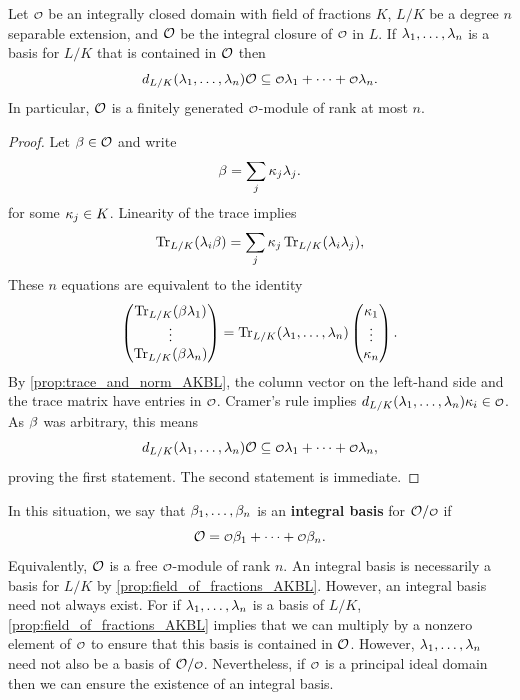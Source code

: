     \begin{lemma}\label{lem:lemma_for_integral_basis_AKBL}
      Let \(\smc{O}\) be an integrally closed domain with field of fractions \(K\), \(L/K\) be a degree \(n\) separable extension, and \(\mathcal{O}\) be the integral closure of \(\smc{O}\) in \(L\). If \(\lambda_{1},\ldots,\lambda_{n}\) is a basis for \(L/K\) that is contained in \(\mathcal{O}\) then
      \[
        d_{L/K}(\l_{1},\ldots,\l_{n})\mc{O} \subseteq \smc{O}\l_{1}+\cdots+\smc{O}\l_{n}.
      \]
      In particular, \(\mathcal{O}\) is a finitely generated \(\smc{O}\)-module of rank at most \(n\).
    \end{lemma}
    \begin{proof}
      Let \(\beta \in \mathcal{O}\) and write
      \[
        \beta =  \sum_{j}\kappa_{j}\lambda_{j}.
      \]
      for some \(\kappa_{j} \in K\). Linearity of the trace implies
      \[
        \operatorname{\mathrm{Tr}}_{L/K}(\lambda_{i}\beta) = \sum_{j}\kappa_{j}\operatorname{\mathrm{Tr}}_{L/K}(\lambda_{i}\lambda_{j}),
      \]
      These \(n\) equations are equivalent to the identity
      \[
        \begin{pmatrix} \operatorname{\mathrm{Tr}}_{L/K}(\beta\lambda_{1}) \\ \vdots \\ \operatorname{\mathrm{Tr}}_{L/K}(\beta\lambda_{n}) \end{pmatrix} = \operatorname{\mathrm{Tr}}_{L/K}(\lambda_{1},\ldots,\lambda_{n})\begin{pmatrix} \kappa_{1} \\ \vdots \\ \kappa_{n} \end{pmatrix}.
      \]
      By \cref{prop:trace_and_norm_AKBL}, the column vector on the left-hand side and the trace matrix have entries in \(\smc{O}\). Cramer's rule implies \(d_{L/K}(\l_{1},\ldots,\l_{n})\k_{i} \in \smc{O}\). As \(\beta\) was arbitrary, this means
      \[
        d_{L/K}(\l_{1},\ldots,\l_{n})\mc{O} \subseteq \smc{O}\l_{1}+\cdots+\smc{O}\l_{n},
      \]
      proving the first statement. The second statement is immediate.
    \end{proof}

    In this situation, we say that \(\beta_{1},\ldots,\beta_{n}\) is an \textbf{integral basis} for \(\mc{O}/\smc{O}\) if
    \[
      \mc{O} = \smc{O}\b_{1}+\cdots+\smc{O}\b_{n}.
    \]
    Equivalently, \(\mathcal{O}\) is a free \(\smc{O}\)-module of rank \(n\). An integral basis is necessarily a basis for \(L/K\) by \cref{prop:field_of_fractions_AKBL}. However, an integral basis need not always exist. For if \(\lambda_{1},\ldots,\lambda_{n}\) is a basis of \(L/K\), \cref{prop:field_of_fractions_AKBL} implies that we can multiply by a nonzero element of \(\smc{O}\) to ensure that this basis is contained in \(\mathcal{O}\). However, \(\lambda_{1},\ldots,\lambda_{n}\) need not also be a basis of \(\mc{O}/\smc{O}\). Nevertheless, if \(\smc{O}\) is a principal ideal domain then we can ensure the existence of an integral basis.
    
